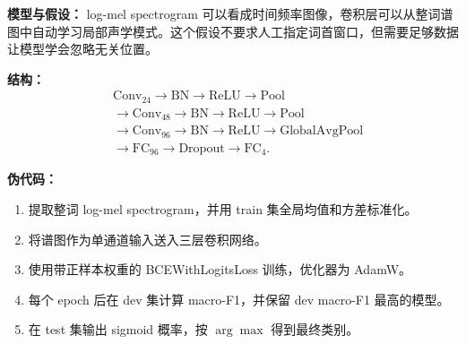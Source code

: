 \textbf{模型与假设：} log-mel spectrogram 可以看成时间频率图像，卷积层可以从整词谱图中自动学习局部声学模式。这个假设不要求人工指定词首窗口，但需要足够数据让模型学会忽略无关位置。

\textbf{结构：}
\[
\begin{aligned}
&\mathrm{Conv}_{24}\rightarrow\mathrm{BN}\rightarrow\mathrm{ReLU}\rightarrow\mathrm{Pool}\\
&\rightarrow\mathrm{Conv}_{48}\rightarrow\mathrm{BN}\rightarrow\mathrm{ReLU}\rightarrow\mathrm{Pool}\\
&\rightarrow\mathrm{Conv}_{96}\rightarrow\mathrm{BN}\rightarrow\mathrm{ReLU}\rightarrow\mathrm{GlobalAvgPool}\\
&\rightarrow\mathrm{FC}_{96}\rightarrow\mathrm{Dropout}\rightarrow\mathrm{FC}_{4}.
\end{aligned}
\]

\textbf{伪代码：}
\begin{enumerate}[nosep]
    \item 提取整词 log-mel spectrogram，并用 train 集全局均值和方差标准化。
    \item 将谱图作为单通道输入送入三层卷积网络。
    \item 使用带正样本权重的 BCEWithLogitsLoss 训练，优化器为 AdamW。
    \item 每个 epoch 后在 dev 集计算 macro-F1，并保留 dev macro-F1 最高的模型。
    \item 在 test 集输出 sigmoid 概率，按 $\arg\max$ 得到最终类别。
\end{enumerate}
